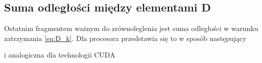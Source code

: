 \subsection{Suma odległości między elementami D}
Ostatnim fragmentem ważnym do zrównoleglenia jest suma odległości w warunku zatrzymania \eqref{eq:D_k}. Dla procesora przedstawia się to w sposób następujący

i analogiczna dla technologii CUDA
